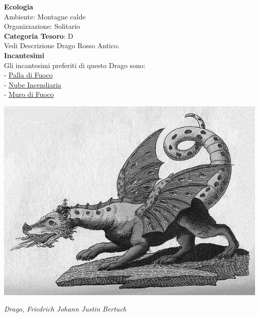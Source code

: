 \begin{multicols}{2}
{\textbf{Ecologia}\\
Ambiente: Montagne calde\\
Organizzazione: Solitario\\
\textbf{Categoria Tesoro}: D\\
Vedi Descrizione Drago Rosso Antico.\\
\textbf{Incantesimi}\\
Gli incantesimi preferiti di questo Drago sono:\\
- \hyperlink{Palla di Fuoco}{Palla di Fuoco}\\
- \hyperlink{Nube Incendiaria}{Nube Incendiaria}\\
- \hyperlink{Muro di Fuoco}{Muro di Fuoco}


\medskip

\begin{center}
\includegraphics[width=0.9\linewidth]{immagini/Friedrich-Johann-Justin-Bertuch_Mythical-Creature-Dragon_1806.png}

\emph{Drago, Friedrich Johann Justin Bertuch}
\end{center}

}
\end{multicols}
